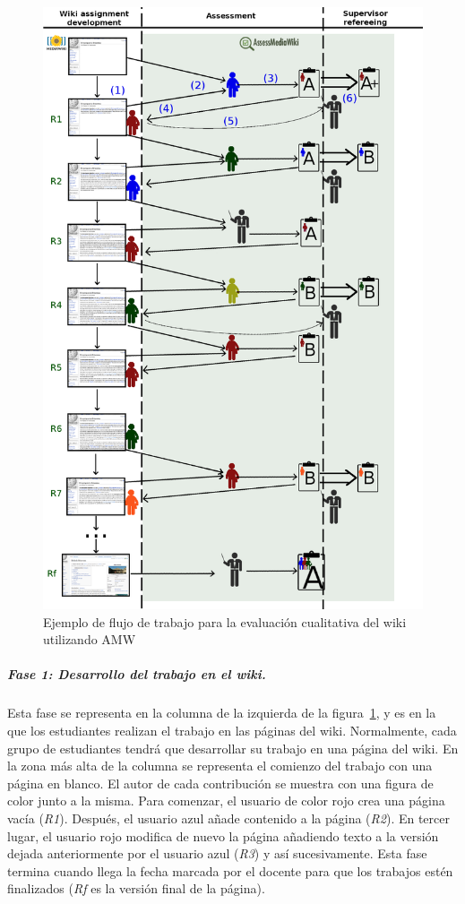 \begin{figure}
  \begin{center}
    \includegraphics[scale=0.28]{AmwDiagram.png}
  \end{center}
  \caption{Ejemplo de flujo de trabajo para la evaluación cualitativa del wiki utilizando AMW}
  \label{fig:AmwDiagram}
\end{figure}

			\subparagraph*{Fase 1: Desarrollo del trabajo en el wiki.}

			Esta fase se representa en la columna de la izquierda de la figura~\ref{fig:AmwDiagram}, y es en la que los estudiantes realizan el trabajo en las páginas del wiki. Normalmente, cada grupo de estudiantes tendrá que desarrollar su trabajo en una página del wiki. En la zona más alta de la columna se representa el comienzo del trabajo con una página en blanco. El autor de cada contribución se muestra con una figura de color junto a la misma. Para comenzar, el usuario de color rojo crea una página vacía (\emph{R1}). Después, el usuario azul añade contenido a la página (\emph{R2}). En tercer lugar, el usuario rojo modifica de nuevo la página añadiendo texto a la versión dejada anteriormente por el usuario azul (\emph{R3}) y así sucesivamente. Esta fase termina cuando llega la fecha marcada por el docente para que los trabajos estén finalizados (\emph{Rf} es la versión final de la página).

